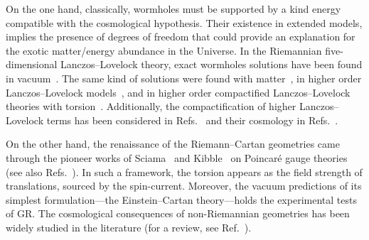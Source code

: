 \documentclass[aps,prd,12pt,superscriptaddress,showpacs,showkeys,longbibliography,reprint,nofootinbib]{revtex4-1}
\begin{document}
On the one hand, classically, wormholes must be supported by a kind energy compatible with the cosmological hypothesis. Their existence in extended models, implies the presence of degrees of freedom that could provide an explanation for the exotic matter/energy abundance in the Universe. In the Riemannian five-dimensional Lanczos--Lovelock theory, exact wormholes solutions have been found in vacuum~\cite{Dotti:2006cp,Dotti:2007az}. The same kind of solutions were found with matter~\cite{Mehdizadeh:2015jra}, in higher order Lanczos--Lovelock models~\cite{Mehdizadeh:2015dta}, and in higher order compactified Lanczos--Lovelock theories with torsion~\cite{Canfora:2008ka}. Additionally, the compactification of higher Lanczos--Lovelock terms has been considered in Refs.~\cite{MuellerHoissen:1985mm,MuellerHoissen:1989yv} and their cosmology in Refs.~\cite{MuellerHoissen:1985ij,Deruelle:1986iv,Deruelle:1989fj}.  

On the other hand, the renaissance of the Riemann--Cartan geometries came through the pioneer works of Sciama~\cite{Sciama:1962} and Kibble~\cite{Kibble:1961ba} on Poincar\'e gauge theories (see also Refs.~\cite{Hehl:1976kj,Blagojevic:2002du}). In such a framework, the torsion appears as the field strength of translations, sourced by the spin-current.
Moreover, the vacuum predictions of its simplest formulation---the Einstein--Cartan theory---holds the experimental tests of GR. The cosmological consequences of non-Riemannian geometries has been widely studied in the literature (for a review, see Ref.~\cite{Puetzfeld:2004yg}). %
\end{document}
